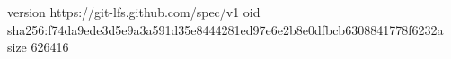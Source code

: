 version https://git-lfs.github.com/spec/v1
oid sha256:f74da9ede3d5e9a3a591d35e8444281ed97e6e2b8e0dfbcb6308841778f6232a
size 626416
